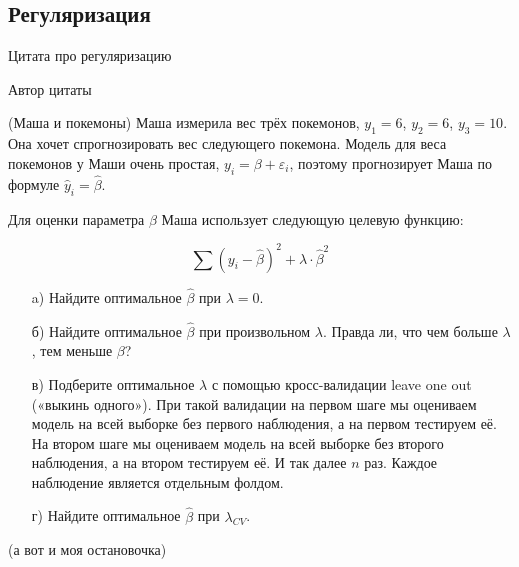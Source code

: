 \subsection*{Регуляризация}

\epigraph{Цитата про регуляризацию}{Автор цитаты}


\begin{problem}{(Маша и покемоны)}
 Маша измерила вес трёх покемонов,  $y_1=6$, $y_2=6$, $y_3=10$.  Она хочет спрогнозировать вес следующего покемона. Модель для веса покемонов у Маши очень простая, $y_i = \beta + \varepsilon_i$, поэтому прогнозирует Маша по формуле $\hat y_i = \hat \beta$.
	
	Для оценки параметра $\beta$ Маша использует следующую целевую функцию:
	
	$$
	\sum (y_i - \hat \beta)^2 + \lambda \cdot \hat \beta^2
	$$
	
	\begin{enumerate}
		\item[a)] Найдите оптимальное $\hat \beta$ при $\lambda =0$.
		\item[б)] Найдите оптимальное $\hat \beta$ при произвольном $\lambda$. Правда ли, что чем больше $\lambda$, тем меньше $\beta$? 
		\item[в)] Подберите оптимальное $\lambda$ с помощью кросс-валидации leave one out («выкинь одного»). При такой валидации на первом шаге мы оцениваем модель на всей выборке без первого наблюдения, а на первом тестируем её. На втором шаге мы оцениваем модель на всей выборке без второго наблюдения, а на втором тестируем её. И так далее $n$ раз. Каждое наблюдение является отдельным фолдом.
		\item[г)] Найдите оптимальное $\hat \beta$ при $\lambda_{CV}$.
	\end{enumerate}
\end{problem}


\begin{problem}{(а вот и моя остановочка)}
\end{problem}


